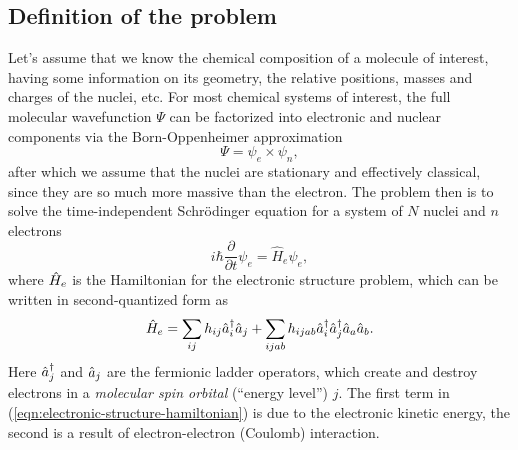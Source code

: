 \subsection{Definition of the problem}
Let's assume that we know the chemical composition of a molecule of interest, having some information on its geometry, the relative positions, masses and charges of the nuclei, etc.  For most chemical systems of interest, the full molecular wavefunction $\Psi$ can be factorized into electronic and nuclear components via the Born-Oppenheimer approximation \cite{Born1927}
\begin{equation}
    \Psi = \psi_e \times \psi_n,
\end{equation}
after which we assume that the nuclei are stationary and effectively classical, since they are so much more massive than the electron. The problem then is to solve the time-independent Schr\"odinger equation for a system of $N$ nuclei and $n$ electrons
\begin{equation}
    i\hbar \frac{\partial}{\partial t} \psi_e = \hat{H}_e \psi_e ,
    \label{eqn:electronic-schrodinger-equation}
\end{equation}
where $\hat{H}_e$ is the Hamiltonian for the electronic structure problem, which can be written 
\cite{Kassal2011}
in second-quantized form as
\begin{equation}
    \hat{H}_e = \sum_{ij} h_{ij} \hat{a}^{\dagger}_i \hat{a}_j + \sum_{ijab} h_{ijab} \hat{a}^{\dagger}_i \hat{a}^{\dagger}_j  \hat{a}_a \hat{a}_b .
    \label{eqn:electronic-structure-hamiltonian}
\end{equation}
Here $\hat{a}^{\dagger}_j$ and $\hat{a}_j$ are the fermionic ladder operators, which create and destroy electrons in a \emph{molecular spin orbital} (``energy level'') $j$. The first term in (\ref{eqn:electronic-structure-hamiltonian}) is due to the electronic kinetic energy, the second is a result of electron-electron (Coulomb) interaction. 

